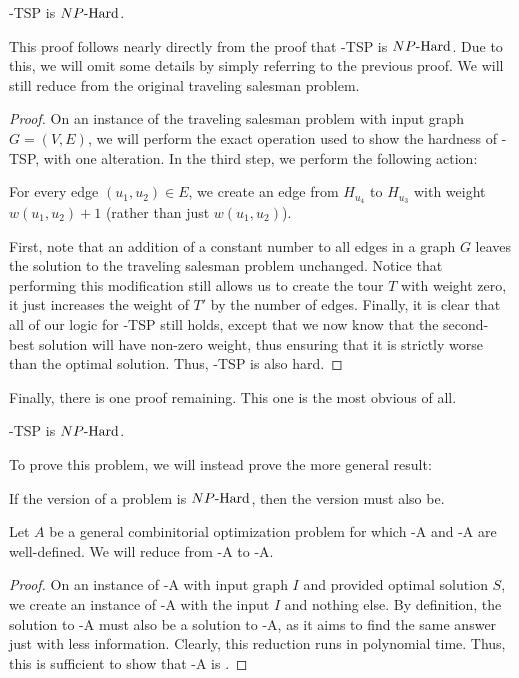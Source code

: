 \begin{theorem}
    \exob{}-TSP is ${NP\text{-Hard{}}}$.
\end{theorem}

This proof follows nearly directly from the proof that \inob{}-TSP is ${NP\text{-Hard{}}}$. Due to this, we will omit some details by simply referring to the previous proof. We will still reduce from the original traveling salesman problem.

\begin{proof}
    On an instance of the traveling salesman problem with input graph $G = (V,E)$, we will perform the exact operation used to show the hardness of \inob{}-TSP, with one alteration. In the third step, we perform the following action:
    
    For every edge $(u_1,u_2) \in E$, we create an edge from $H_{u_4}$ to $H_{u_3}$ with weight $w(u_1,u_2) + 1$ (rather than just $w(u_1,u_2)$).

    First, note that an addition of a constant number to all edges in a graph $G$ leaves the solution to the traveling salesman problem unchanged. Notice that performing this modification still allows us to create the tour $T$ with weight zero, it just increases the weight of $T'$ by the number of edges. Finally, it is clear that all of our logic for \inob{}-TSP still holds, except that we now know that the second-best solution will have non-zero weight, thus ensuring that it is strictly worse than the optimal solution. Thus, \exob{}-TSP is also hard.
\end{proof}

Finally, there is one proof remaining. This one is the most obvious of all.
\begin{theorem}
    \exb{}-TSP is ${NP\text{-Hard{}}}$.
\end{theorem}

To prove this problem, we will instead prove the more general result:
\begin{theorem}
\label{exbhard}
    If the \exob{} version of a problem is ${NP\text{-Hard{}}}$, then the \exb{} version must also be.
\end{theorem}

Let $A$ be a general combinitorial optimization problem for which \exb{}-A and \exob{}-A are well-defined. We will reduce from \exob{}-A to \exb{}-A.

\begin{proof}
    On an instance of \exob{}-A with input graph $I$ and provided optimal solution $S$, we create an instance of \exb{}-A with the input $I$ and nothing else. By definition, the solution to \exb{}-A must also be a solution to \exob{}-A, as it aims to find the same answer just with less information. Clearly, this reduction runs in polynomial time. Thus, this is sufficient to show that \exb{}-A is \nph.
\end{proof}


